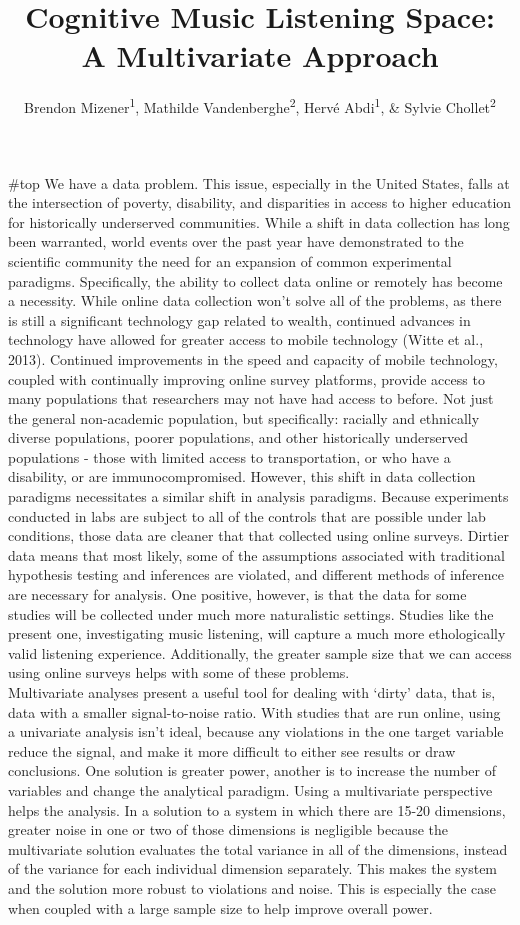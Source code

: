\documentclass[
  english,
  man,floatsintext]{apa6}
\title{Cognitive Music Listening Space: A Multivariate Approach}
\author{Brendon Mizener\textsuperscript{1}, Mathilde Vandenberghe\textsuperscript{2}, Hervé Abdi\textsuperscript{1}, \& Sylvie Chollet\textsuperscript{2}}
\date{}
\affiliation{\vspace{0.5cm}\textsuperscript{1} University of Texas at Dallas\\\textsuperscript{2} YNCREA}
\begin{document}
\maketitle

\#top
We have a data problem. This issue, especially in the United States, falls at the intersection of poverty, disability, and disparities in access to higher education for historically underserved communities. While a shift in data collection has long been warranted, world events over the past year have demonstrated to the scientific community the need for an expansion of common experimental paradigms. Specifically, the ability to collect data online or remotely has become a necessity. While online data collection won't solve all of the problems, as there is still a significant technology gap related to wealth, continued advances in technology have allowed for greater access to mobile technology (Witte et al., 2013). Continued improvements in the speed and capacity of mobile technology, coupled with continually improving online survey platforms, provide access to many populations that researchers may not have had access to before. Not just the general non-academic population, but specifically: racially and ethnically diverse populations, poorer populations, and other historically underserved populations - those with limited access to transportation, or who have a disability, or are immunocompromised.
However, this shift in data collection paradigms necessitates a similar shift in analysis paradigms. Because experiments conducted in labs are subject to all of the controls that are possible under lab conditions, those data are cleaner that that collected using online surveys. Dirtier data means that most likely, some of the assumptions associated with traditional hypothesis testing and inferences are violated, and different methods of inference are necessary for analysis. One positive, however, is that the data for some studies will be collected under much more naturalistic settings. Studies like the present one, investigating music listening, will capture a much more ethologically valid listening experience. Additionally, the greater sample size that we can access using online surveys helps with some of these problems.\\
Multivariate analyses present a useful tool for dealing with `dirty' data, that is, data with a smaller signal-to-noise ratio. With studies that are run online, using a univariate analysis isn't ideal, because any violations in the one target variable reduce the signal, and make it more difficult to either see results or draw conclusions. One solution is greater power, another is to increase the number of variables and change the analytical paradigm. Using a multivariate perspective helps the analysis. In a solution to a system in which there are 15-20 dimensions, greater noise in one or two of those dimensions is negligible because the multivariate solution evaluates the total variance in all of the dimensions, instead of the variance for each individual dimension separately. This makes the system and the solution more robust to violations and noise. This is especially the case when coupled with a large sample size to help improve overall power.\\
\end{document}
